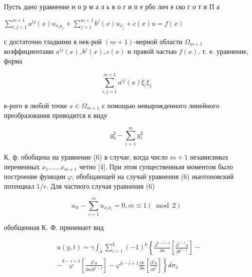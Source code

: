\documentclass[10pt]{article}
\begin{document}
Пусть дано уравнение н о р м а л ь в о г и п е рбо лич е ско г о т и П а



$\sum_{i, j=1}^{m+1} a^{i j}(x) u_{x_{i} y_{j}}+\sum_{j=1}^{m+1} b^{j}(x) u_{x_{j}}+c(x) u=f(x)$



с достаточно гладкими в нек-рой $(m+1)$-мерной области $\Omega_{m+1}$ коэффициентами $a^{i j}(x), b^{j}(x), c(x)$ и правой частью $f(x)$, т. е. уравнение, форма



\[

\sum_{i, j=1}^{m+1} a^{i j}(x) \xi_{i} \xi_{j}

\]



к-рого в любой точке $x \in \Omega_{m+1}$ с помощью невырожденного линейного преобразования приводится к виду



\[

y_{0}^{2}-\sum_{i=1}^{m} y_{i}^{2}

\]



К. ф. обобщена на уравнение (6) в случае, когда число $m+1$ независимых переменных $x_{1}, \ldots, x_{m+1}$ четно [4]. При этом супцественным моментом было построение функции $\varphi$, обобщающей на случай уравнения (6) ньютоновский потенциал $1 / r$. Для частного случая уравнения (6)



\[

u_{t t}-\sum_{i=1}^{m} u_{x_{i} x_{i}}=0, m \equiv 1(\bmod 2)

\]



обобщенная К. Ф. принимает вид



\[

\begin{aligned}

& u(y, t)=\gamma \int_{\sigma} \sum_{i=1}^{k}(-1)^{k}\left\{\frac{\partial^{k-i+1}}{\partial n}\left[\frac{\partial^{i-1} u}{\partial t^{i-1}}\right]-\right. \\

& \left.-\stackrel{k-i+1}{\varphi}\left[\frac{\partial^{i} u}{\partial n \partial t^{i-1}}\right]-\varphi^{k-i+1} \frac{\partial r}{\partial n}\left[\frac{\partial^{i} u}{\partial t^{i}}\right]\right\} d \sigma_{x}

\end{aligned}

\]
\end{document}
